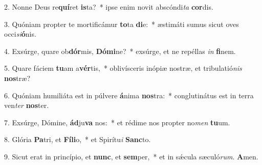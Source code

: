 2. Nonne Deus re\textbf{quí}ret \textbf{is}ta?~*  ipse enim novit abscóndi\textit{ta} \textbf{cor}dis.\

3. Quóniam propter te mortificámur \textbf{to}ta \textbf{di}e:~*  æstimáti sumus sicut oves occi\textit{si}\textbf{ó}nis.\

4. Exsúrge, quare ob\textbf{dór}mis, \textbf{Dó}\textbf{mi}ne?~*  exsúrge, et ne repéllas \textit{in} \textbf{fi}nem.\

5. Quare fáciem \textbf{tu}am a\textbf{vér}tis,~*  oblivísceris inópiæ nostræ, et tribulatió\textit{nis} \textbf{nos}træ?\

6. Quóniam humiliáta est in púlvere \textbf{á}nima \textbf{nos}tra:~*  conglutinátus est in terra ven\textit{ter} \textbf{nos}ter.\

7. Exsúrge, Dómine, \textbf{ád}ju\textbf{va} nos:~*  et rédime nos propter no\textit{men} \textbf{tu}um.\

8. Glória \textbf{Pa}tri, et \textbf{Fí}\textbf{li}o,~*  et Spirítu\textit{i} \textbf{Sanc}to.\

9. Sicut erat in princípio, et \textbf{nunc}, et \textbf{sem}per,~*  et in sǽcula sæculó\textit{rum}. \textbf{A}men.\

